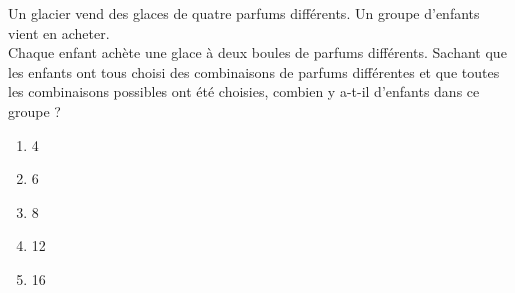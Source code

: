 Un glacier vend des glaces de quatre parfums différents. Un groupe d'enfants vient en acheter.\\
Chaque enfant achète une glace à deux boules de parfums différents. Sachant que les enfants ont tous choisi des combinaisons de parfums différentes et que toutes les combinaisons possibles ont été choisies, combien y a-t-il d'enfants dans ce groupe ?
\begin{multicols}{5}
  \begin{enumerate}[A/]
  \item 4
  \item 6
  \item 8
  \item 12
  \item 16
  \end{enumerate}
\end{multicols}
